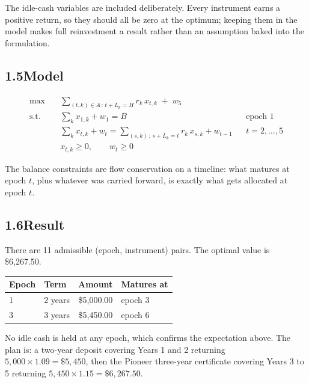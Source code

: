 \documentclass[11pt]{article}
\DeclareMathOperator*{\maximize}{max}
\begin{document}
The idle-cash variables are included deliberately. Every instrument
earns a positive return, so they should all be zero at the optimum;
keeping them in the model makes full reinvestment a result rather than
an assumption baked into the formulation.

\subsection*{1.5\quad Model}

\begin{align}
  \maximize \quad
    & \sum_{(t,k) \in A \,:\, t + L_k = H} r_k\, x_{t,k} \;+\; w_5 \\[4pt]
  \text{s.t.} \quad
    & \sum_{k} x_{1,k} + w_1 = B
      && \text{epoch } 1 \\[2pt]
    & \sum_{k} x_{t,k} + w_t
      = \sum_{(s,k) \,:\, s + L_k = t} r_k\, x_{s,k} + w_{t-1}
      && t = 2,\dots,5 \\[2pt]
    & x_{t,k} \ge 0, \qquad w_t \ge 0 &&
\end{align}

The balance constraints are flow conservation on a timeline: what
matures at epoch $t$, plus whatever was carried forward, is exactly what
gets allocated at epoch $t$.

\subsection*{1.6\quad Result}

There are 11 admissible (epoch, instrument) pairs. The optimal value is
\$6,267.50.

\begin{center}
\begin{tabular}{@{}llrl@{}}
\toprule
Epoch & Term & Amount & Matures at \\
\midrule
1 & 2 years & \$5,000.00 & epoch 3 \\
3 & 3 years & \$5,450.00 & epoch 6 \\
\bottomrule
\end{tabular}
\end{center}

No idle cash is held at any epoch, which confirms the expectation above.
The plan is: a two-year deposit covering Years 1 and 2 returning
$5{,}000 \times 1.09 = \$5{,}450$, then the Pioneer three-year
certificate covering Years 3 to 5 returning
$5{,}450 \times 1.15 = \$6{,}267.50$.

\newpage
\end{document}
